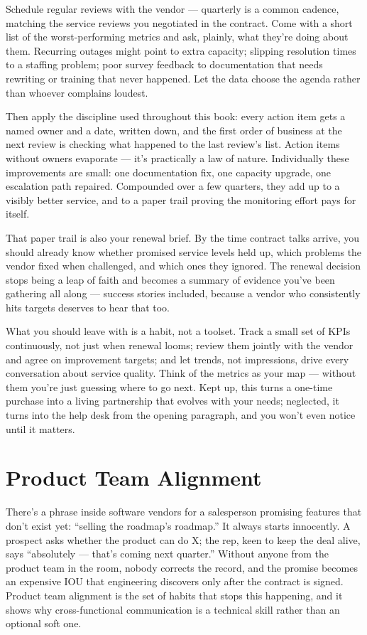 Schedule regular reviews with the vendor — quarterly is a common cadence, matching the service reviews you negotiated in the contract. Come with a short list of the worst-performing metrics and ask, plainly, what they're doing about them. Recurring outages might point to extra capacity; slipping resolution times to a staffing problem; poor survey feedback to documentation that needs rewriting or training that never happened. Let the data choose the agenda rather than whoever complains loudest.


Then apply the discipline used throughout this book: every action item gets a named owner and a date, written down, and the first order of business at the next review is checking what happened to the last review's list. Action items without owners evaporate — it's practically a law of nature. Individually these improvements are small: one documentation fix, one capacity upgrade, one escalation path repaired. Compounded over a few quarters, they add up to a visibly better service, and to a paper trail proving the monitoring effort pays for itself.


That paper trail is also your renewal brief. By the time contract talks arrive, you should already know whether promised service levels held up, which problems the vendor fixed when challenged, and which ones they ignored. The renewal decision stops being a leap of faith and becomes a summary of evidence you've been gathering all along — success stories included, because a vendor who consistently hits targets deserves to hear that too.


What you should leave with is a habit, not a toolset. Track a small set of KPIs continuously, not just when renewal looms; review them jointly with the vendor and agree on improvement targets; and let trends, not impressions, drive every conversation about service quality. Think of the metrics as your map — without them you're just guessing where to go next. Kept up, this turns a one-time purchase into a living partnership that evolves with your needs; neglected, it turns into the help desk from the opening paragraph, and you won't even notice until it matters.

\section{Product Team Alignment}
There's a phrase inside software vendors for a salesperson promising features that don't exist yet: ``selling the roadmap's roadmap.'' It always starts innocently. A prospect asks whether the product can do X; the rep, keen to keep the deal alive, says ``absolutely — that's coming next quarter.'' Without anyone from the product team in the room, nobody corrects the record, and the promise becomes an expensive IOU that engineering discovers only after the contract is signed. Product team alignment is the set of habits that stops this happening, and it shows why cross-functional communication is a technical skill rather than an optional soft one.



